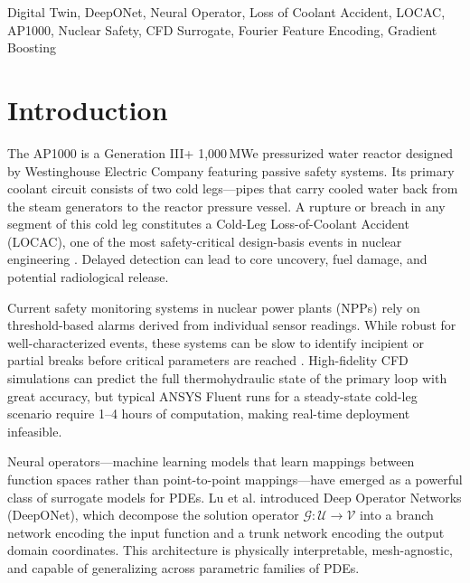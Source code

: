 \documentclass[conference]{IEEEtran}
\begin{document}
\begin{IEEEkeywords}
Digital Twin, DeepONet, Neural Operator, Loss of Coolant Accident, LOCAC, AP1000, Nuclear Safety, CFD Surrogate, Fourier Feature Encoding, Gradient Boosting
\end{IEEEkeywords}

\section{Introduction}

The AP1000 is a Generation III+ 1,000\,MWe pressurized water reactor designed by Westinghouse Electric Company featuring passive safety systems. Its primary coolant circuit consists of two cold legs—pipes that carry cooled water back from the steam generators to the reactor pressure vessel. A rupture or breach in any segment of this cold leg constitutes a Cold-Leg Loss-of-Coolant Accident (LOCAC), one of the most safety-critical design-basis events in nuclear engineering \cite{wecdcd}. Delayed detection can lead to core uncovery, fuel damage, and potential radiological release.

Current safety monitoring systems in nuclear power plants (NPPs) rely on threshold-based alarms derived from individual sensor readings. While robust for well-characterized events, these systems can be slow to identify incipient or partial breaks before critical parameters are reached \cite{nrc_loca}. High-fidelity CFD simulations can predict the full thermohydraulic state of the primary loop with great accuracy, but typical ANSYS Fluent runs for a steady-state cold-leg scenario require 1–4 hours of computation, making real-time deployment infeasible.

Neural operators—machine learning models that learn mappings between function spaces rather than point-to-point mappings—have emerged as a powerful class of surrogate models for PDEs. Lu et al. \cite{lu2021deeponet} introduced Deep Operator Networks (DeepONet), which decompose the solution operator $\mathcal{G}: \mathcal{U} \to \mathcal{V}$ into a branch network encoding the input function and a trunk network encoding the output domain coordinates. This architecture is physically interpretable, mesh-agnostic, and capable of generalizing across parametric families of PDEs.
\end{document}
